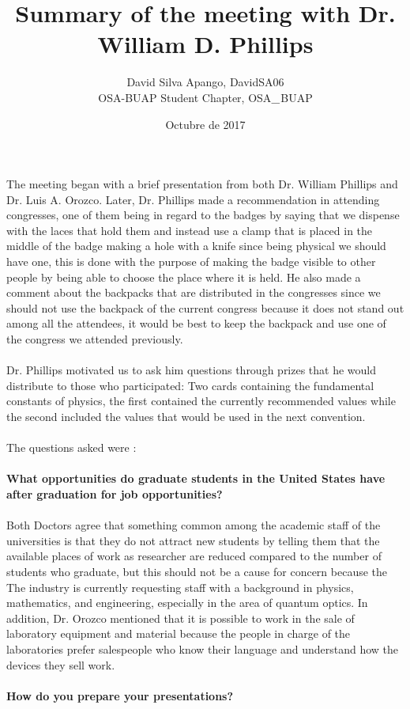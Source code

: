 \documentclass[10pt,letterpaper]{article}
\title{Summary of the meeting with Dr. William D. Phillips}
\date{Octubre de 2017}
\author{David Silva Apango, \faTwitter DavidSA06\\ OSA-BUAP Student Chapter, \faTwitter OSA$\char`_$BUAP}
\begin{document}
\maketitle
The meeting began with a brief presentation from both Dr. William Phillips and Dr. Luis A. Orozco. Later, Dr. Phillips made a recommendation in attending congresses, one of them being in regard to the badges by saying that we dispense with the laces that hold them and instead use a clamp that is placed in the middle of the badge making a hole with a knife since being physical we should have one, this is done with the purpose of making the badge visible to other people by being able to choose the place where it is held. He also made a comment about the backpacks that are distributed in the congresses since we should not use the backpack of the current congress because it does not stand out among all the attendees, it would be best to keep the backpack and use one of the congress we attended previously.
\\
\\
Dr. Phillips motivated us to ask him questions through prizes that he would distribute to those who participated: Two cards containing the fundamental constants of physics, the first contained the currently recommended values while the second included the values that would be used in the next convention. 
\\
\\
The questions asked were :
\\
\\
\textbf{What opportunities do graduate students in the United States have after graduation for job opportunities?}
\\
\\
Both Doctors agree that something common among the academic staff of the universities is that they do not attract new students by telling them that the available places of work as researcher are reduced compared to the number of students who graduate, but this should not be a cause for concern because the The industry is currently requesting staff with a background in physics, mathematics, and engineering, especially in the area of quantum optics. In addition, Dr. Orozco mentioned that it is possible to work in the sale of laboratory equipment and material because the people in charge of the laboratories prefer salespeople who know their language and understand how the devices they sell work.
\\
\\
\textbf{How do you prepare your presentations?}
\end{document}
